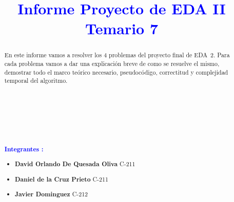 \documentclass{article}
\begin{document}
    \title{\textcolor{blue}{\textbf{Informe Proyecto de EDA II \\Temario 7}}\\}
    
    \date{} 
    \maketitle  

    \begin{abstract}
        \noindent En este informe  vamos a resolver los 4 problemas del proyecto final de 
        EDA~2. Para cada problema vamos a dar  una explicaci\'on breve de como se resuelve el mismo, demostrar todo el marco te\'orico necesario, 
        pseudoc\'odigo, correctitud y complejidad temporal del algoritmo.\\\\
        \\\\
        \\\\
        \\\\
        {\large{ \textcolor{blue}{\textbf{Integrantes :}}}}
        \begin{itemize}
            \item \textbf{David Orlando De Quesada Oliva}  C-211
            \item \textbf{Daniel de la Cruz Prieto} C-211
            \item \textbf{Javier Dominguez} C-212
        \end{itemize}
       
    \end{abstract}
\end{document}

